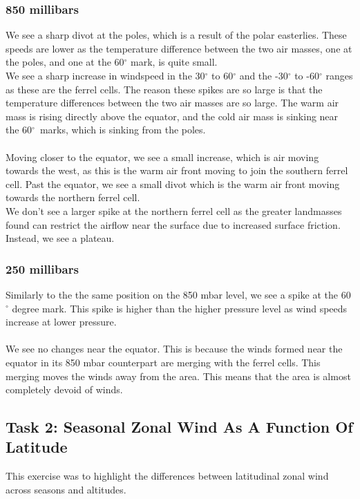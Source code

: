 \documentclass[hidelinks]{article}
\begin{document}
\subsubsection{850 millibars} 
We see a sharp divot at the poles, which is a result of the polar easterlies. These speeds are lower as the temperature difference between the two air masses, one at the poles, and one at the 60$^\circ$ mark, is quite small. \\
We see a sharp increase in windspeed in the 30$^\circ$ to 60$^\circ$ and the -30$^\circ$ to -60$^\circ$ ranges as these are the ferrel cells. The reason these spikes are so large is that the temperature differences between the two air masses are so large. The warm air mass is rising directly above the equator, and the cold air mass is sinking near the 60$^\circ$ marks, which is sinking from the poles. \\\\
\noindent Moving closer to the equator, we see a small increase, which is air moving towards the west, as this is the warm air front moving to join the southern ferrel cell. Past the equator, we see a small divot which is the warm air front moving towards the northern ferrel cell.\\
We don't see a larger spike at the northern ferrel cell as the greater landmasses found can restrict the airflow near the surface due to increased surface friction. Instead, we see a plateau.

\subsubsection{250 millibars}
Similarly to the the same position on the 850 mbar level, we see a spike at the 60$^\circ$ degree mark. This spike is higher than the higher pressure level as wind speeds increase at lower pressure. \\\\
\noindent
We see no changes near the equator. This is because the winds formed near the equator in its 850 mbar counterpart are merging with the ferrel cells. This merging moves the winds away from the area. This means that the area is almost completely devoid of winds. \\

\subsection{Task 2: Seasonal Zonal Wind As A Function Of Latitude}
This exercise was to highlight the differences between latitudinal zonal wind across seasons and altitudes.
\end{document}
